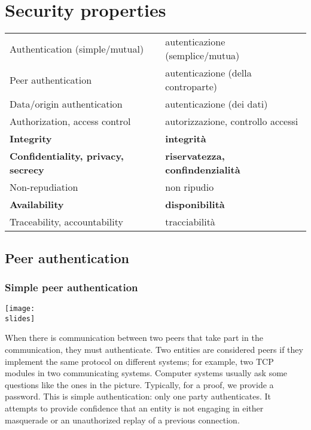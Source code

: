 \section{Security properties}
\begin{center}
  \begin{tabular}{||l l||}
    \hline
    Authentication (simple/mutual)             & autenticazione (semplice/mutua)         \\
    Peer authentication                        & autenticazione (della controparte)      \\
    Data/origin authentication                 & autenticazione (dei dati)               \\
    Authorization, access control              & autorizzazione, controllo accessi       \\
    \textbf{Integrity}                         & \textbf{integrità}                      \\
    \textbf{Confidentiality, privacy, secrecy} & \textbf{riservatezza, confindenzialità} \\
    Non-repudiation                            & non ripudio                             \\
    \textbf{Availability}                      & \textbf{disponibilità}                  \\
    Traceability, accountability               & tracciabilità                           \\
    \hline
  \end{tabular}
\end{center}


\subsection{Peer authentication}

\subsubsection*{Simple peer authentication}

\noindent
\begin{minipage}{0.5\textwidth}
  \centering
  \texttt{[image: \\slides]}
\end{minipage}
\hspace{0.05\textwidth}
\begin{minipage}{0.4\textwidth}
  When there is communication between two peers that take part in the communication, they must authenticate. Two entities are considered peers if they implement the same protocol on different systems; for example, two TCP modules in two communicating systems. Computer systems usually ask some questions like the ones in the picture. Typically, for a proof, we provide a password. This is simple authentication: only one party authenticates. It attempts to provide confidence that an entity is not engaging in either masquerade or an unauthorized replay of a previous connection.
\end{minipage}


